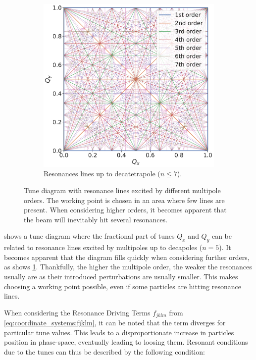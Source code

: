 \begin{figure}[!htb]
\begin{subfigure}[b]{0.6\textwidth}
        \includegraphics[width=\textwidth]{images/resonance_diagram_n7.pdf}
        \caption{Resonances lines up to decatetrapole ($n \leq 7$).}
        \label{fig:resonances:diagram_n7}
    \end{subfigure}
    \caption{Tune diagram with resonance lines excited by different multipole orders. The working
    point is chosen in an area where few lines are present. When considering higher orders, it
    becomes apparent that the beam will inevitably hit several resonances.}
    \label{fig:resonances:diagrams}
\end{figure}

 shows a tune diagram where the fractional part of tunes $Q_x$ and
$Q_y$ can be related to resonance lines excited by multipoles up to decapoles ($n=5$).
It becomes apparent that the diagram fills quickly when considering further orders, as shows
\cref{fig:resonances:diagram_n7}. Thankfully, the higher the multipole order, the weaker the
resonances usually are as their introduced perturbations are usually smaller. This makes choosing a
working point possible, even if some particles are hitting resonance lines.


When considering the Resonance Driving Terms $f_{jklm}$ from \cref{eq:coordinate_systems:fjklm}, it
can be noted that the term diverges for particular tune values. This leads to a disproportionate
increase in particles position in phase-space, eventually leading to loosing them.
Resonant conditions due to the tunes can thus be described by the following condition:

